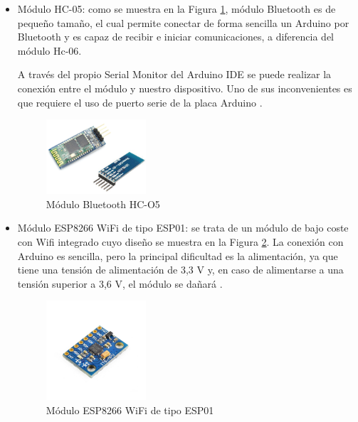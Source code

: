 \begin{itemize}
    \item Módulo HC-05: como se muestra en la Figura \ref{fig:HC-O5}, módulo Bluetooth es de pequeño tamaño, el cual permite conectar de forma sencilla un Arduino por Bluetooth y es capaz de recibir e iniciar comunicaciones, a diferencia del módulo Hc-06.
    
    A través del propio Serial Monitor del Arduino IDE se puede realizar la conexión entre el módulo y nuestro dispositivo. Uno de sus inconvenientes es que requiere el uso de puerto serie de la placa Arduino \cite{website:luisllamas-BT}.

    \begin{figure}[ht]
        \centering
        \includegraphics[width=0.35\textwidth]{img/arduino-bluetooth-hc05.png}
        \caption{Módulo Bluetooth HC-O5  \cite{website:luisllamas-BT} }
        \label{fig:HC-O5}
    \end{figure}

    \item Módulo ESP8266 WiFi de tipo ESP01: se trata de un módulo de bajo coste con Wifi integrado cuyo diseño se muestra en la Figura \ref{fig:ESP8266}. La conexión con Arduino es sencilla, pero la principal dificultad es la alimentación, ya que tiene una tensión de alimentación de 3,3 V y, en caso de alimentarse a una tensión superior a 3,6 V, el módulo se dañará \cite{website:luisllamas-wifi}. 

    \begin{figure}[ht]
        \centering
        \includegraphics[width=0.35\textwidth]{img/modulo6050.jpg}
        \caption{Módulo ESP8266 WiFi de tipo ESP01  \cite{website:descubrearduino} }
        \label{fig:ESP8266}
    \end{figure}
\end{itemize}

